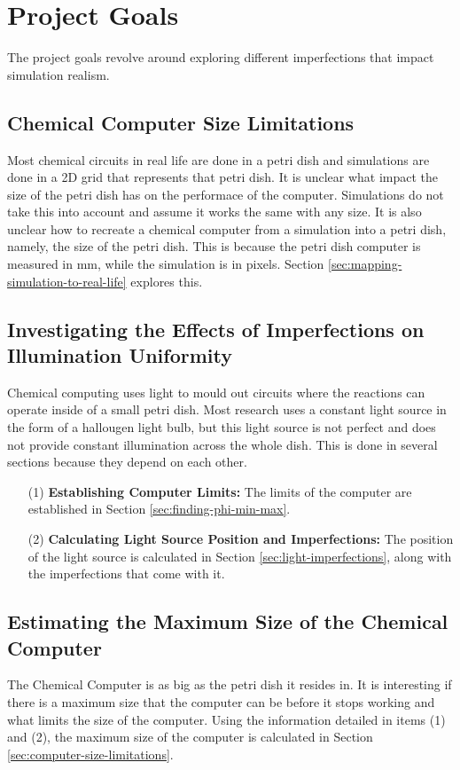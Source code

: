 \section{Project Goals}\label{sec:goals}
The project goals revolve around exploring different imperfections that impact simulation realism.

\subsection{Chemical Computer Size Limitations} \label{sec:computer-size}
Most chemical circuits in real life are done in a petri dish and simulations are done in a 2D grid that represents that petri dish.
It is unclear what impact the size of the petri dish has on the performace of the computer. Simulations do not take this into account and assume it works the same with any size. 
It is also unclear how to recreate a chemical computer from a simulation into a petri dish, namely, the size of the petri dish. 
This is because the petri dish computer is measured in mm, while the simulation is in pixels. Section \ref{sec:mapping-simulation-to-real-life} explores this.

\subsection{Investigating the Effects of Imperfections on Illumination Uniformity}
Chemical computing uses light to mould out circuits where the reactions can operate inside of a small petri dish. 
Most research  uses a constant light source in the form of a hallougen light bulb, but this light source is not perfect and does not provide constant illumination across the whole dish. 
This is done in several sections because they depend on each other. 
\begin{enumerate}
    \item[(1)] \textbf{Establishing Computer Limits:} The limits of the computer are established in Section \ref{sec:finding-phi-min-max}.
    \item[(2)] \textbf{Calculating Light Source Position and Imperfections:} The position of the light source is calculated in Section \ref{sec:light-imperfections}, along with the imperfections that come with it.
\end{enumerate}

\subsection{Estimating the Maximum Size of the Chemical Computer}
The Chemical Computer is as big as the petri dish it resides in. It is interesting if there is a maximum size that the computer can be before it stops working and 
what limits the size of the computer. 
Using the information detailed in items (1) and (2), the maximum size of the computer is calculated in Section \ref{sec:computer-size-limitations}.

